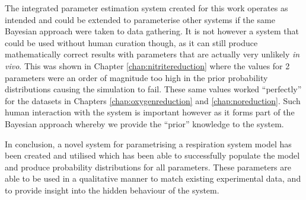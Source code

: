 The integrated parameter estimation system created for this work operates as intended and could be extended to parameterise other systems if the same Bayesian approach were taken to data gathering. It is not however a system that could be used without human curation though, as it can still produce mathematically correct results with parameters that are actually very unlikely \textit{in vivo}. This was shown in Chapter \ref{chap:nitritereduction} where the values for 2 parameters were an order of magnitude too high in the prior probability distributions causing the simulation to fail. These same values worked ``perfectly'' for the datasets in Chapters \ref{chap:oxygenreduction} and \ref{chap:noreduction}. Such human interaction with the system is important however as it forms part of the Bayesian approach whereby we provide the ``prior'' knowledge to the system.

In conclusion, a novel system for parametrising a respiration system model has been created and utilised which has been able to successfully populate the model and produce probability distributions for all parameters. These parameters are able to be used in a qualitative manner to match existing experimental data, and to provide insight into the hidden behaviour of the system.